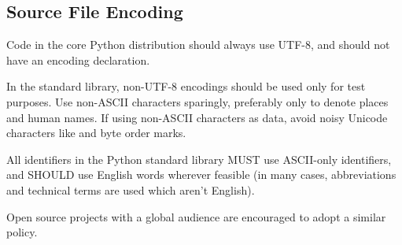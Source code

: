 \documentclass[a4paper,11pt]{article}
\begin{document}
\subsection{Source File Encoding}
Code in the core Python distribution should always use UTF-8, and should not
have an encoding declaration.
\par
In the standard library, non-UTF-8 encodings should be used only for test
purposes. Use non-ASCII characters sparingly, preferably only to denote places
and human names. If using non-ASCII characters as data, avoid noisy Unicode
characters like  and byte order marks.
\par
All identifiers in the Python standard library MUST use ASCII-only identifiers,
and SHOULD use English words wherever feasible (in many cases, abbreviations and
technical terms are used which aren’t English).
\par
Open source projects with a global audience are encouraged to adopt a similar
policy.
\par
\end{document}
